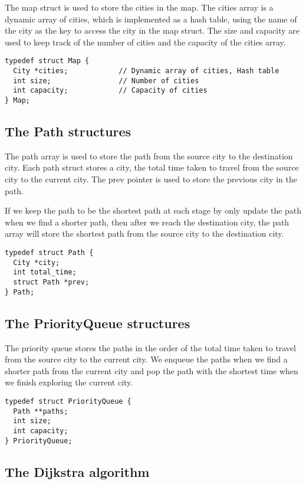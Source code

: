 \documentclass[a4paper,11pt]{article}
\begin{document}
The map struct is used to store the cities in the map. The cities array is a dynamic array of cities,
which is implemented as a hash table, using the name of the city as the key to access the city in the map struct.
The size and capacity are used to keep track of the number of cities and the capacity of the cities array.

\begin{verbatim}
typedef struct Map {
  City *cities;            // Dynamic array of cities, Hash table
  int size;                // Number of cities
  int capacity;            // Capacity of cities
} Map;
\end{verbatim}

\subsection*{The Path structures}

The path array is used to store the path from the source city to the destination city.
Each path struct stores a city, the total time taken to travel from the source city to the current city.
The prev pointer is used to store the previous city in the path.

If we keep the path to be the shortest path at each stage by only update the path when we find a shorter path,
then after we reach the destination city, the path array will store the shortest path from the source city to the destination city.

\begin{verbatim}
typedef struct Path {
  City *city;
  int total_time;
  struct Path *prev;
} Path;
\end{verbatim}

\subsection*{The PriorityQueue structures}

The priority queue stores the paths in the order of the total time taken to travel from the source city to the current city.
We enqueue the paths when we find a shorter path from the current city and pop the path with the shortest time
when we finish exploring the current city.

\begin{verbatim}
typedef struct PriorityQueue {
  Path **paths;
  int size;
  int capacity;
} PriorityQueue;
\end{verbatim}

\subsection*{The Dijkstra algorithm}
\end{document}
